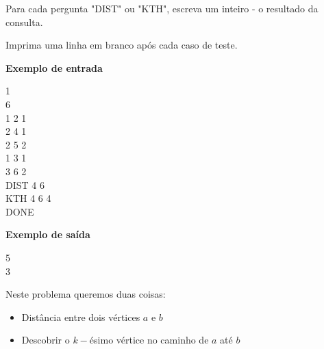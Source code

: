 \begin{mdframed}[backgroundcolor=blue!5]
Para cada pergunta "DIST" ou "KTH", escreva um inteiro - o resultado da consulta.

Imprima uma linha em branco após cada caso de teste.

\vspace{0.75cm}

\begin{minipage}{.4\linewidth}
    {\large{\textbf{Exemplo de entrada}}}\vspace{0.2cm}
    \begin{mdframed}[backgroundcolor=gray!10]
        \vspace{-0.5cm}
        1\\

        6\\
        1 2 1\\
        2 4 1\\
        2 5 2\\
        1 3 1\\
        3 6 2\\
        DIST 4 6\\
        KTH 4 6 4\\
        DONE
        \vspace{-0.4cm}
    \end{mdframed}
\end{minipage}
\hspace{2cm}
\begin{minipage}{.4\linewidth}
    \vspace{-4.55cm}
    {\large{\textbf{Exemplo de saída}}}\vspace{0.2cm}
    \begin{mdframed}[backgroundcolor=gray!10]
        \vspace{-0.5cm}
        5\\
        3
        \vspace{-0.4cm}
    \end{mdframed}
\end{minipage}%

\vspace{-0.4cm}
\end{mdframed}

Neste problema queremos duas coisas:

\begin{itemize}
    \item Distância entre dois vértices $a$ e $b$
    \item Descobrir o $k-$ésimo vértice no caminho de $a$ até $b$
\end{itemize}

